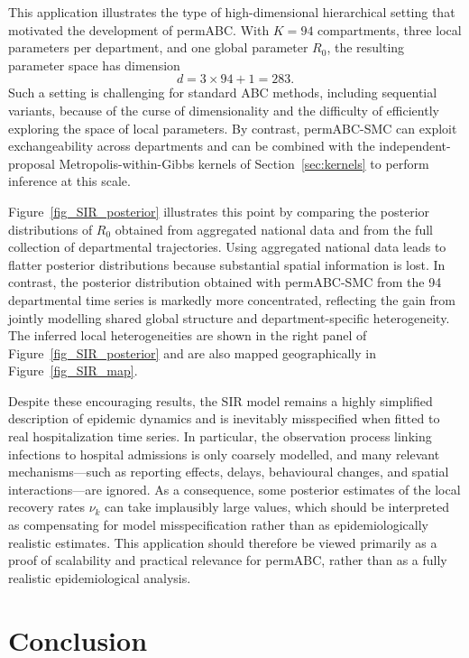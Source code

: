 \documentclass[lineno]{biometrika}
\begin{document}
This application illustrates the type of high-dimensional hierarchical setting that motivated the development of permABC. With \(K=94\) compartments, three local parameters per department, and one global parameter \(R_0\), the resulting parameter space has dimension
\[
d = 3 \times 94 + 1 = 283.
\]
Such a setting is challenging for standard ABC methods, including sequential variants, because of the curse of dimensionality and the difficulty of efficiently exploring the space of local parameters. By contrast, permABC-SMC can exploit exchangeability across departments and can be combined with the independent-proposal Metropolis-within-Gibbs kernels of Section~\ref{sec:kernels} to perform inference at this scale.

Figure~\ref{fig_SIR_posterior} illustrates this point by comparing the posterior distributions of \(R_0\) obtained from aggregated national data and from the full collection of departmental trajectories. Using aggregated national data leads to flatter posterior distributions because substantial spatial information is lost. In contrast, the posterior distribution obtained with permABC-SMC from the 94 departmental time series is markedly more concentrated, reflecting the gain from jointly modelling shared global structure and department-specific heterogeneity. The inferred local heterogeneities are shown in the right panel of Figure~\ref{fig_SIR_posterior} and are also mapped geographically in Figure~\ref{fig_SIR_map}.

Despite these encouraging results, the SIR model remains a highly simplified description of epidemic dynamics and is inevitably misspecified when fitted to real hospitalization time series. In particular, the observation process linking infections to hospital admissions is only coarsely modelled, and many relevant mechanisms---such as reporting effects, delays, behavioural changes, and spatial interactions---are ignored. As a consequence, some posterior estimates of the local recovery rates \(\nu_k\) can take implausibly large values, which should be interpreted as compensating for model misspecification rather than as epidemiologically realistic estimates. This application should therefore be viewed primarily as a proof of scalability and practical relevance for permABC, rather than as a fully realistic epidemiological analysis.

\section{Conclusion}
\end{document}
